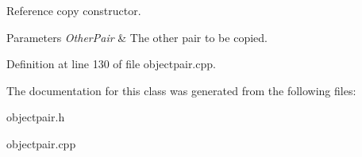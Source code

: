 Reference copy constructor. 


\begin{DoxyParams}{Parameters}
{\em OtherPair} & The other pair to be copied. \\
\hline
\end{DoxyParams}


Definition at line 130 of file objectpair.cpp.



The documentation for this class was generated from the following files:\begin{DoxyCompactItemize}
\item 
objectpair.h\item 
objectpair.cpp\end{DoxyCompactItemize}

